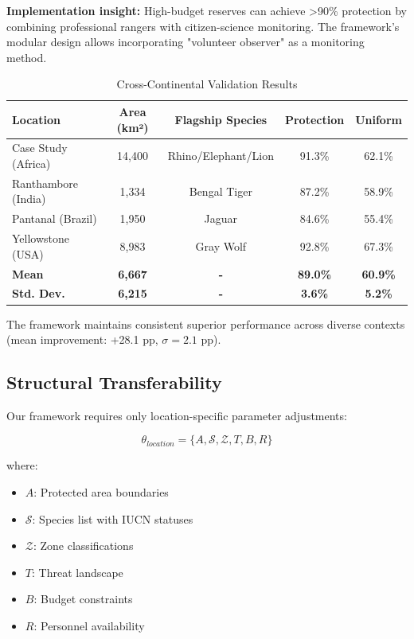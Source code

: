 \textbf{Implementation insight:} High-budget reserves can achieve >90\% protection by combining professional rangers with citizen-science monitoring. The framework's modular design allows incorporating "volunteer observer" as a monitoring method.

\begin{table}[h]
\centering
\caption{Cross-Continental Validation Results}
\begin{tabular}{lcccc}
\hline
\textbf{Location} & \textbf{Area (km²)} & \textbf{Flagship Species} & \textbf{Protection} & \textbf{Uniform} \\
\hline
Case Study (Africa) & 14,400 & Rhino/Elephant/Lion & 91.3\% & 62.1\% \\
Ranthambore (India) & 1,334 & Bengal Tiger & 87.2\% & 58.9\% \\
Pantanal (Brazil) & 1,950 & Jaguar & 84.6\% & 55.4\% \\
Yellowstone (USA) & 8,983 & Gray Wolf & 92.8\% & 67.3\% \\
\hline
\textbf{Mean} & \textbf{6,667} & \textbf{-} & \textbf{89.0\%} & \textbf{60.9\%} \\
\textbf{Std. Dev.} & \textbf{6,215} & \textbf{-} & \textbf{3.6\%} & \textbf{5.2\%} \\
\hline
\end{tabular}
\end{table}

The framework maintains consistent superior performance across diverse contexts (mean improvement: +28.1 pp, $\sigma = 2.1$ pp).

\subsection{Structural Transferability}

Our framework requires only location-specific parameter adjustments:

\begin{equation}
\theta_{location} = \{A, \mathcal{S}, \mathcal{Z}, T, B, R\}
\label{eq:parameters}
\end{equation}

where:
\begin{itemize}
    \item $A$: Protected area boundaries
    \item $\mathcal{S}$: Species list with IUCN statuses
    \item $\mathcal{Z}$: Zone classifications
    \item $T$: Threat landscape
    \item $B$: Budget constraints
    \item $R$: Personnel availability
\end{itemize}

